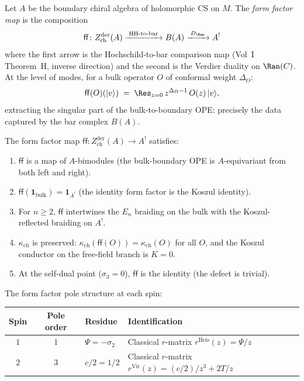 \begin{construction}
\label{constr:form-factor-map}
Let $A$ be the boundary chiral algebra of holomorphic CS on $M$. The \emph{form factor map} is the composition
\[
 \mathsf{ff} \colon Z^{\mathrm{der}}_{\mathrm{ch}}(A) \xrightarrow{\;\text{HH-to-bar}\;} B(A) \xrightarrow{\;D_{\Ran}\;} A^!
\]
where the first arrow is the Hochschild-to-bar comparison map (Vol~I Theorem~H, inverse direction) and the second is the Verdier duality on $\Ran(C)$. At the level of modes, for a bulk operator $O$ of conformal weight $\Delta_O$:
\[
 \mathsf{ff}(O)(|v\rangle) \;=\; \Res_{z=0}\, z^{\Delta_O - 1}\, O(z)\, |v\rangle,
\]
extracting the singular part of the bulk-to-boundary OPE: precisely the data captured by the bar complex $B(A)$.
\end{construction}

\begin{proposition}
\label{prop:form-factor-axioms}
The form factor map $\mathsf{ff} \colon Z^{\mathrm{der}}_{\mathrm{ch}}(A) \to A^!$ satisfies:
\begin{enumerate}[label=\textup{(FF\arabic*)}]
 \item $\mathsf{ff}$ is a map of $A$-bimodules (the bulk-boundary OPE is $A$-equivariant from both left and right).
 \item $\mathsf{ff}(\mathbf{1}_{\mathrm{bulk}}) = \mathbf{1}_{A^!}$ (the identity form factor is the Koszul identity).
 \item For $n \geq 2$, $\mathsf{ff}$ intertwines the $E_n$ braiding on the bulk with the Koszul-reflected braiding on $A^!$.
 \item $\kappa_{\mathrm{ch}}$ is preserved: $\kappa_{\mathrm{ch}}(\mathsf{ff}(O)) = \kappa_{\mathrm{ch}}(O)$ for all $O$, and the Koszul conductor on the free-field branch is $K = 0$.
 \item At the self-dual point ($\sigma_3 = 0$), $\mathsf{ff}$ is the identity (the defect is trivial).
\end{enumerate}
The form factor pole structure at each spin:
\begin{center}
\small
\renewcommand{\arraystretch}{1.15}
\begin{tabular}{ccll}
\toprule
\textbf{Spin} & \textbf{Pole order} & \textbf{Residue} & \textbf{Identification} \\
\midrule
$1$ & $1$ & $\Psi = -\sigma_2$ & Classical $r$-matrix $r^{\mathrm{Heis}}(z) = \Psi/z$ \\
$2$ & $3$ & $c/2 = 1/2$ & Classical $r$-matrix $r^{\mathrm{Vir}}(z) = (c/2)/z^3 + 2T/z$ \\
\bottomrule
\end{tabular}
\end{center}
\end{proposition}

